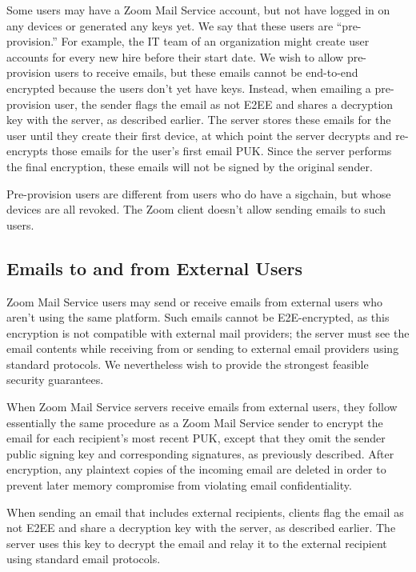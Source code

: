 Some users may have a Zoom Mail Service account, but not have logged in on any devices or generated
any keys yet. We say that these users are ``pre-provision.'' For example, the IT team of an
organization might create user accounts for every new hire before their start date. We wish to allow
pre-provision users to receive emails, but these emails cannot be end-to-end encrypted because the
users don't yet have keys. Instead, when emailing a pre-provision user, the sender flags the email
as not E2EE and shares a decryption key with the server, as described earlier. The server stores
these emails for the user until they create their first device, at which point the server decrypts
and re-encrypts those emails for the user's first email PUK. Since the server performs the final
encryption, these emails will not be signed by the original sender.

Pre-provision users are different from users who do have a sigchain, but whose devices are all
revoked. The Zoom client doesn't allow sending emails to such users.

\subsection{Emails to and from External Users}
\label{sec:mailext}

Zoom Mail Service users may send or receive emails from external users who aren't using the same
platform. Such emails cannot be E2E-encrypted, as this encryption is not compatible with external
mail providers; the server must see the email contents while receiving from or sending to external
email providers using standard protocols. We nevertheless wish to provide the strongest feasible
security guarantees.

When Zoom Mail Service servers receive emails from external users, they follow essentially the same
procedure as a Zoom Mail Service sender to encrypt the email for each recipient's most recent PUK,
except that they omit the sender public signing key and corresponding signatures, as previously
described. After encryption, any plaintext copies of the incoming email are deleted in order to
prevent later memory compromise from violating email confidentiality.

When sending an email that includes external recipients, clients flag the email as not E2EE and
share a decryption key with the server, as described earlier. The server uses this key to decrypt
the email and relay it to the external recipient using standard email protocols.

